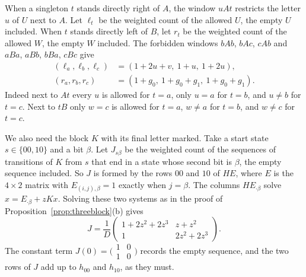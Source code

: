 When a singleton $t$ stands directly right of $A$, the window $uAt$ restricts the letter $u$
of $U$ next to $A$. Let $\ell_t$ be the weighted count of the allowed $U$, the empty $U$
included. When $t$ stands directly left of $B$, let $r_t$ be the weighted count of the allowed
$W$, the empty $W$ included. The forbidden windows $bAb$, $bAc$, $cAb$ and $aBa$, $aBb$,
$bBa$, $cBc$ give
\begin{equation}\label{eq:lr}
\begin{aligned}
(\ell_a,\ell_b,\ell_c)&=(1+2u+v,\ 1+u,\ 1+2u),\\
(r_a,r_b,r_c)&=(1+g_0,\ 1+g_0+g_1,\ 1+g_0+g_1).
\end{aligned}
\end{equation}
Indeed next to $At$ every $u$ is allowed for $t=a$, only $u=a$ for $t=b$, and $u\ne b$ for
$t=c$. Next to $tB$ only $w=c$ is allowed for $t=a$, $w\ne a$ for $t=b$, and $w\ne c$ for
$t=c$.

We also need the block $K$ with its final letter marked. Take a start state $s\in\{00,10\}$
and a bit $\beta$. Let $J_{s\beta}$ be the weighted count of the sequences of transitions of
$K$ from $s$ that end in a state whose second bit is $\beta$, the empty sequence included. So
$J$ is formed by the rows $00$ and $10$ of $HE$, where $E$ is the $4\times2$ matrix with
$E_{(i,j),\beta}=1$ exactly when $j=\beta$. The columns $HE_{\cdot\beta}$ solve
$x=E_{\cdot\beta}+zKx$. Solving these two systems as in the proof of
Proposition~\ref{prop:threeblock}(b) gives
\begin{equation}\label{eq:J}
J=\frac1D\begin{pmatrix}1+2z^2+2z^3&z+z^2\\1&2z^2+2z^3\end{pmatrix}.
\end{equation}
The constant term $J(0)=\bigl(\begin{smallmatrix}1&0\\1&0\end{smallmatrix}\bigr)$ records the
empty sequence, and the two rows of $J$ add up to $h_{00}$ and $h_{10}$, as they must.


